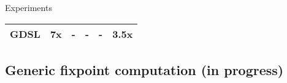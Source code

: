 \begin{frame}{Experiments}
\begin{center}
\begin{tabular}{   |l|c||c|c|c||c|  }
     \hline
     \hline

     GDSL &  7x &  -  & -  &  -  & 3.5x  \\ 

     \hline

     \end{tabular}
     \end{center}
\end{frame}







\subsection{Generic fixpoint computation (in progress)}

